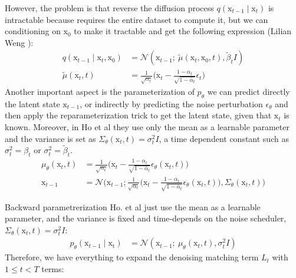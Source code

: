 However, the problem is that reverse the diffusion process $q(\mathrm{x}_{t-1}\mid\mathrm{x}_{t})$ is intractable because requires the entire dataset to compute it, but we can conditioning on $\mathrm{x}_{0}$ to make it tractable and get the following expression (Lilian Weng \citep{weng2021diffusion}):
\begin{align}\label{eqn:reverse-forward-process}
    q(\mathrm{x}_{t-1}\mid\mathrm{x}_{t}, \mathrm{x}_{0}) &= \mathcal{N}(\mathrm{x}_{t-1};~\tilde{\mu}(\mathrm{x}_{t}, \mathrm{x}_{0}, t), \tilde{\beta}_{t}I) \\
    \tilde{\mu}(\mathrm{x}_{t}, t) &= \frac{1}{\sqrt{\alpha_{t}}}\bigg(\mathrm{x}_{t} - \frac{1 - \alpha_{t}}{\sqrt{1-\bar{\alpha}_{t}}} \epsilon_{t} \bigg) 
\end{align}
Another important aspect is the parameterization of $p_{\theta}$ we can predict directly the latent state $\mathrm{x}_{t-1}$, or indirectly by predicting the noise perturbation $\epsilon_{\theta}$ and then apply the reparameterization trick to get the latent state, given that $\mathrm{x}_{t}$ is known. Moreover,
in Ho et al \cite{ho2020denoising} they use only the mean as a learnable parameter and the variance is set as $\Sigma_{\theta}(\mathrm{x}_{t}, t)=\sigma_{t}^2I$, a time dependent constant such as $\sigma_{t}^{2}=\beta_{t}$ or $\sigma_{t}^{2}=\tilde{\beta}_{t}$.
\begin{align}\label{eqn:backward-noise-reparameterization}
    \mu_{\theta}(\mathrm{x}_{t}, t) &= \frac{1}{\sqrt{\alpha_{t}}}\big(\mathrm{x}_{t} - \frac{1-\alpha_{t}}{\sqrt{1-\bar{\alpha}_{t}}}\epsilon_{\theta}(\mathrm{x}_{t}, t)\big) \\
    \mathrm{x}_{t-1} &= \mathcal{N}\big(\mathrm{x}_{t-1}; \frac{1}{\sqrt{\alpha_{t}}}\big(\mathrm{x}_{t} - \frac{1-\alpha_{t}}{\sqrt{1-\bar{\alpha}_{t}}}\epsilon_{\theta}(\mathrm{x}_{t}, t)\big), \Sigma_{\theta}(\mathrm{x}_{t}, t)\big)
\end{align}

Backward parametrerization Ho. et al just use the mean as a learnable parameter, and the variance is fixed and time-depends on the noise scheduler, 
$\Sigma_{\theta}(\mathrm{x}_{t}, t) = \sigma_{t}^{2}I$:
\begin{align}\label{eqn:backward-process-fix-variance}
    p_{\theta}(\mathrm{x}_{t-1}\mid\mathrm{x_{t}}) &= \mathcal{N}(\mathrm{x}_{t-1};~\mu_{\theta}(\mathrm{x}_{t}, t), \sigma_{t}^{2}I)
\end{align}
Therefore, we have everything to expand the denoising matching term $L_t$ with $1\leq t < T$ terms:

